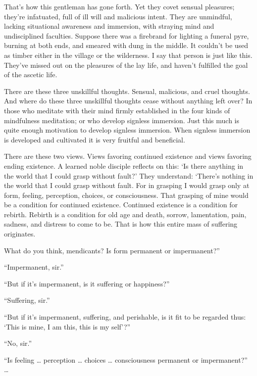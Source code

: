 \documentclass[12pt,openany]{book}%
\begin{document}
That’s how this gentleman has gone forth. Yet they covet sensual pleasures; they’re infatuated, full of ill will and malicious intent. They are unmindful, lacking situational awareness and immersion, with straying mind and undisciplined faculties. Suppose there was a firebrand for lighting a funeral pyre, burning at both ends, and smeared with dung in the middle. It couldn’t be used as timber either in the village or the wilderness. I say that person is just like this. They’ve missed out on the pleasures of the lay life, and haven’t fulfilled the goal of the ascetic life. 

There are these three unskillful thoughts. Sensual, malicious, and cruel thoughts. And where do these three unskillful thoughts cease without anything left over? In those who meditate with their mind firmly established in the four kinds of mindfulness meditation; or who develop signless immersion. Just this much is quite enough motivation to develop signless immersion. When signless immersion is developed and cultivated it is very fruitful and beneficial. 

There are these two views. Views favoring continued existence and views favoring ending existence. A learned noble disciple reflects on this: ‘Is there anything in the world that I could grasp without fault?’ They understand: ‘There’s nothing in the world that I could grasp without fault. For in grasping I would grasp only at form, feeling, perception, choices, or consciousness. That grasping of mine would be a condition for continued existence. Continued existence is a condition for rebirth. Rebirth is a condition for old age and death, sorrow, lamentation, pain, sadness, and distress to come to be. That is how this entire mass of suffering originates. 

What do you think, mendicants? Is form permanent or impermanent?” 

“Impermanent, sir.” 

“But if it’s impermanent, is it suffering or happiness?” 

“Suffering, sir.” 

“But if it’s impermanent, suffering, and perishable, is it fit to be regarded thus: ‘This is mine, I am this, this is my self’?” 

“No, sir.” 

“Is feeling … perception … choices … consciousness permanent or impermanent?” … 
\end{document}
